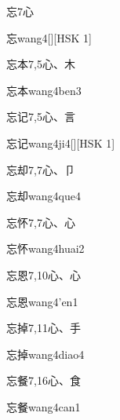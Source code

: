 \begin{Entry}{忘}{7}{⼼}
  \begin{Phonetics}{忘}{wang4}[][HSK 1]
  \end{Phonetics}
\end{Entry}

\begin{Entry}{忘本}{7,5}{⼼、⽊}
  \begin{Phonetics}{忘本}{wang4ben3}
  \end{Phonetics}
\end{Entry}

\begin{Entry}{忘记}{7,5}{⼼、⾔}
  \begin{Phonetics}{忘记}{wang4ji4}[][HSK 1]
  \end{Phonetics}
\end{Entry}

\begin{Entry}{忘却}{7,7}{⼼、⼙}
  \begin{Phonetics}{忘却}{wang4que4}
  \end{Phonetics}
\end{Entry}

\begin{Entry}{忘怀}{7,7}{⼼、⼼}
  \begin{Phonetics}{忘怀}{wang4huai2}
  \end{Phonetics}
\end{Entry}

\begin{Entry}{忘恩}{7,10}{⼼、⼼}
  \begin{Phonetics}{忘恩}{wang4'en1}
  \end{Phonetics}
\end{Entry}

\begin{Entry}{忘掉}{7,11}{⼼、⼿}
  \begin{Phonetics}{忘掉}{wang4diao4}
  \end{Phonetics}
\end{Entry}

\begin{Entry}{忘餐}{7,16}{⼼、⾷}
  \begin{Phonetics}{忘餐}{wang4can1}
  \end{Phonetics}
\end{Entry}

